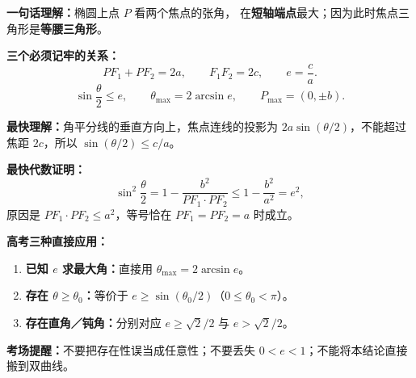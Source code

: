 \begin{summarybox}
\textbf{一句话理解：}椭圆上点 $P$ 看两个焦点的张角，
在\textbf{短轴端点}最大；因为此时焦点三角形是\textbf{等腰三角形}。

\medskip
\textbf{三个必须记牢的关系：}
\[
PF_1+PF_2=2a,\qquad F_1F_2=2c,\qquad e=\frac ca.
\]
\[
\boxed{\sin\frac\theta2\le e},
\qquad
\boxed{\theta_{\max}=2\arcsin e},
\qquad
\boxed{P_{\max}=(0,\pm b)}.
\]

\textbf{最快理解：}角平分线的垂直方向上，焦点连线的投影为
$2a\sin(\theta/2)$，不能超过焦距 $2c$，所以 $\sin(\theta/2)\le c/a$。

\textbf{最快代数证明：}
\[
\sin^2\frac\theta2
=1-\frac{b^2}{PF_1\cdot PF_2}
\le1-\frac{b^2}{a^2}=e^2,
\]
原因是 $PF_1\cdot PF_2\le a^2$，等号恰在 $PF_1=PF_2=a$ 时成立。

\textbf{高考三种直接应用：}
\begin{enumerate}
    \item \textbf{已知 $e$ 求最大角：}直接用 $\theta_{\max}=2\arcsin e$。
    \item \textbf{存在 $\theta\ge\theta_0$：}等价于
    $e\ge\sin(\theta_0/2)$（$0\le\theta_0<\pi$）。
    \item \textbf{存在直角／钝角：}分别对应
    $e\ge\sqrt2/2$ 与 $e>\sqrt2/2$。
\end{enumerate}

\textbf{考场提醒：}不要把存在性误当成任意性；不要丢失
$0<e<1$；不能将本结论直接搬到双曲线。
\end{summarybox}
